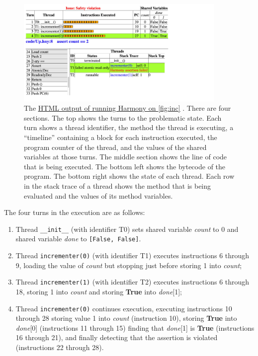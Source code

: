 \documentclass{report}
\newcommand{\harmonyref}[2]{%
\href{https://harmony.cs.cornell.edu/output/#1}{\underline{#2}}%
}
\begin{document}
\begin{figure}
\begin{center}
\includegraphics[width=0.9\textwidth]{figures/Up1.pdf}
\end{center}
\caption{The
\harmonyref{Up.html}{HTML output of running Harmony on \autoref{fig:inc}}.
There are four sections.
The top shows the turns to the problematic state.
Each turn shows a thread identifier, the method the thread is executing,
a ``timeline'' containing a block for each instruction executed, the
program counter of the thread, and the values of the shared variables
at those turns.
The middle section shows the line of code that is being executed.
The bottom left shows the bytecode of the program.
The bottom right shows the state of each thread.
Each row in the stack trace of a thread shows
the method that is being evaluated and
the values of its method variables.}
\label{fig:inchtml1}
\end{figure}

The four turns in the execution are as follows:

\begin{enumerate}
\item Thread \texttt{\_\_init\_\_} (with identifier T0)
sets shared variable \textit{count} to 0 and
shared variable \textit{done} to \texttt{[False, False]}.
\item Thread \texttt{incrementer(0)} (with identifier T1)
executes instructions 6 through 9, loading the value of
\textit{count} but stopping just before storing 1 into \textit{count};
\item Thread \texttt{incrementer(1)} (with identifier T2)
executes instructions 6 through 18, storing 1 into
\textit{count} and storing \textbf{True} into \textit{done}[1];
\item Thread \texttt{incrementer(0)}
continues execution, executing instructions 10 through 28
storing value 1 into \textit{count} (instruction 10),
storing \textbf{True} into \textit{done}[0] (instructions 11 through 15)
finding that \textit{done}[1] is \textbf{True} (instructions 16 through 21),
and finally detecting that the assertion is violated
(instructions 22 through 28).
\end{enumerate}
\end{document}
